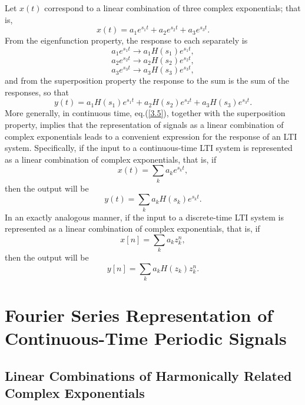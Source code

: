 \documentclass[a4paper,10pt,twoside]{book}
\begin{document}
Let $x(t)$ correspond to a linear combination of three complex exponentials; that is,
\begin{equation}
    x(t)=a_1e^{s_1t}+a_2e^{s_2t}+a_3e^{s_3t}.
    \label{3.11}
\end{equation}
From the eigenfunction property, the response to each separately is $$a_1e^{s_1t}\longrightarrow a_1H(s_1)e^{s_1t},$$$$a_2e^{s_2t}\longrightarrow a_2H(s_2)e^{s_2t},$$$$a_3e^{s_3t}\longrightarrow a_3H(s_3)e^{s_3t},$$ and from the superposition property the response to the sum is the sum of the responses, so that
\begin{equation}
    y(t)=a_1H(s_1)e^{s_1t}+a_2H(s_2)e^{s_2t}+a_3H(s_3)e^{s_3t}.
    \label{3.12}
\end{equation}
More generally, in continuous time, eq.\;(\ref{3.5}), together with the superposition property, implies that the representation of signals as a linear combination of complex exponentials leads to a convenient expression for the response of an LTI system. Specifically, if the input to a continuous-time LTI system is represented as a linear combination of complex exponentials, that is, if
\begin{equation}
    x(t)=\sum_ka_ke^{s_kt},
    \label{3.13}
\end{equation}
then the output will be
\begin{equation}
    y(t)=\sum_ka_kH(s_k)e^{s_kt}.
    \label{3.14}
\end{equation}
In an exactly analogous manner, if the input to a discrete-time LTI system is represented as a linear combination of complex exponentials, that is, if
\begin{equation}
    x[n]=\sum_ka_kz_k^n,
    \label{3.15}
\end{equation}
then the output will be
\begin{equation}
    y[n]=\sum_ka_kH(z_k)z_k^n.
    \label{3.16}
\end{equation}

\section{Fourier Series Representation of Continuous-Time Periodic Signals}
\label{section:3.3}

\subsection{Linear Combinations of Harmonically Related Complex Exponentials}
\end{document}
